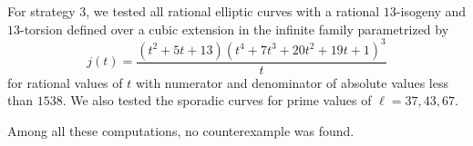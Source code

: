 \documentclass[12pt]{article}
\theoremstyle{plain}
\theoremstyle{definition}
\begin{document}
For strategy 3, we tested all rational elliptic curves
with a rational $13$-isogeny and $13$-torsion defined over a cubic extension
in the infinite family parametrized by
\[
j(t) = \frac{\left(t^2 + 5t + 13\right)\left(t^4 + 7t^3 + 20t^2 + 19t + 1\right)^3}{t}
\]
for rational values of $t$ with numerator and denominator of absolute values
less than $1538$.
We also tested the sporadic curves for prime values of $\ell = 37, 43, 67$.

Among all these computations, no counterexample was found.



\end{document}
